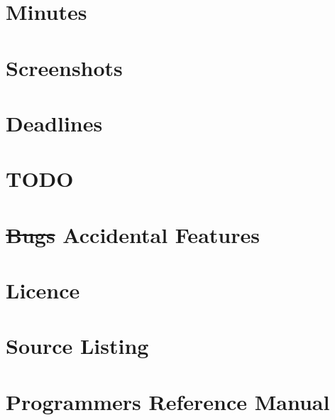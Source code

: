 \documentclass[openany]{book}
\begin{document}
\begin{appendices}
\appendixpage %
\noappendicestocpagenum %
\addappheadtotoc %

\chapter{Minutes}

\chapter{Screenshots}

\chapter{Deadlines}

\chapter{TODO}

\chapter{\sout{Bugs} Accidental Features}

\chapter{Licence}

\chapter{Source Listing}

\chapter{Programmers Reference Manual}

\end{appendices}

\listoftodos
\todototoc

\printbibliography
\end{document}
